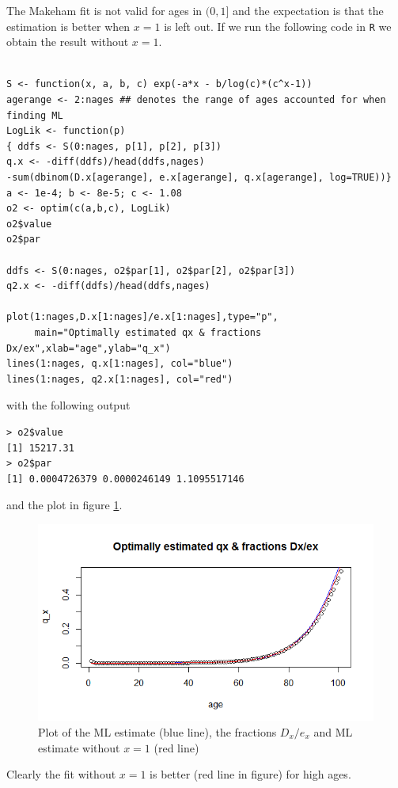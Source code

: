 The Makeham fit is not valid for ages in $(0,1]$ and the expectation is that the estimation is better when $x=1$ is left out. If we run the following code in \verb|R| we obtain the result without $x=1$.
\begin{verbatim}

S <- function(x, a, b, c) exp(-a*x - b/log(c)*(c^x-1))
agerange <- 2:nages ## denotes the range of ages accounted for when finding ML
LogLik <- function(p)
{ ddfs <- S(0:nages, p[1], p[2], p[3])
q.x <- -diff(ddfs)/head(ddfs,nages)
-sum(dbinom(D.x[agerange], e.x[agerange], q.x[agerange], log=TRUE))}
a <- 1e-4; b <- 8e-5; c <- 1.08
o2 <- optim(c(a,b,c), LogLik) 
o2$value
o2$par

ddfs <- S(0:nages, o2$par[1], o2$par[2], o2$par[3])
q2.x <- -diff(ddfs)/head(ddfs,nages)

plot(1:nages,D.x[1:nages]/e.x[1:nages],type="p",
     main="Optimally estimated qx & fractions Dx/ex",xlab="age",ylab="q_x")
lines(1:nages, q.x[1:nages], col="blue")
lines(1:nages, q2.x[1:nages], col="red")

\end{verbatim}

with the following output

\begin{verbatim}
> o2$value
[1] 15217.31
> o2$par
[1] 0.0004726379 0.0000246149 1.1095517146
\end{verbatim}

and the plot in figure \ref{Figure_Question9_2}.

\begin{center}
\begin{figure}

\includegraphics[scale=1]{Question_9_MakehamGompertz_2.png}

\caption{Plot of the ML estimate (blue line), the fractions $D_x/e_x$ and ML estimate without $x=1$ (red line)}
\label{Figure_Question9_2}

\end{figure}
\end{center}
Clearly the fit without $x=1$ is better (red line in figure) for high ages.

